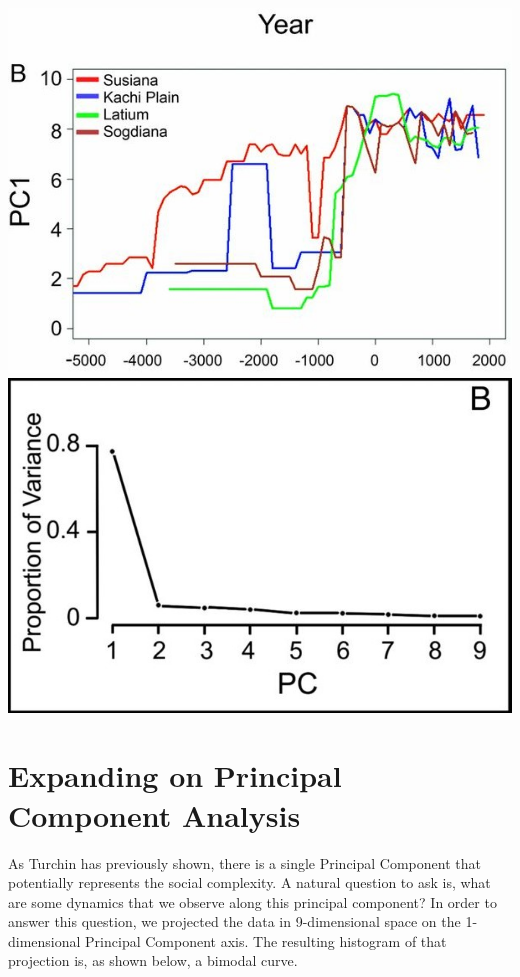 \documentclass[11pt]{article}
\begin{document}
\begin{center}
	\includegraphics[scale=0.30]{time_pc.jpg}
	\includegraphics[scale=0.25]{pc_variance.jpg}
\end{center}

\section{Expanding on Principal Component Analysis}

As Turchin has previously shown, there is a single Principal Component that potentially represents the social complexity. A natural question to ask is, what are some dynamics that we observe along this principal component? In order to answer this question, we projected the data in 9-dimensional space on the 1-dimensional Principal Component axis. The resulting histogram of that projection is, as shown below, a bimodal curve. 
\end{document}
